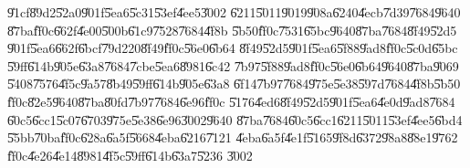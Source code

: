 \U{91cf}\U{89d2}\U{52a0}\U{901f}\U{5ea6}\U{5c31}\U{53ef}\U{4ee5}\U{3002}%
\U{6211}\U{5011}\U{9019}\U{908a}\U{6240}\U{4ecb}\U{7d39}\U{7684}\U{9640}%
\U{87ba}\U{ff0c}\U{662f}\U{4e00}\U{500b}\U{61c9}\U{7528}\U{7684}\U{4f8b}%
\U{5b50}\U{ff0c}\U{7531}\U{65bc}\U{9640}\U{87ba}\U{7684}\U{8f49}\U{52d5}%
\U{901f}\U{5ea6}\U{662f}\U{6bcf}\U{79d2}20\U{8f49}\U{ff0c}\U{56e0}\U{6b64}%
\U{8f49}\U{52d5}\U{901f}\U{5ea6}\U{5f88}\U{9ad8}\U{ff0c}\U{5c0d}\U{65bc}%
\U{59ff}\U{614b}\U{905e}\U{63a8}\U{7684}\U{7cbe}\U{5ea6}\U{8981}\U{6c42}%
\U{7b97}\U{5f88}\U{9ad8}\U{ff0c}\U{56e0}\U{6b64}\U{9640}\U{87ba}\U{9069}%
\U{5408}\U{7576}\U{4f5c}\U{9a57}\U{8b49}\U{59ff}\U{614b}\U{905e}\U{63a8}%
\U{6f14}\U{7b97}\U{7684}\U{975e}\U{5e38}\U{597d}\U{7684}\U{4f8b}\U{5b50}%
\U{ff0c}\U{82e5}\U{9640}\U{87ba}\U{80fd}\U{7b97}\U{7684}\U{6e96}\U{ff0c}%
\U{5176}\U{4ed6}\U{8f49}\U{52d5}\U{901f}\U{5ea6}\U{4e0d}\U{9ad8}\U{7684}%
\U{60c5}\U{6cc1}\U{5c07}\U{6703}\U{975e}\U{5e38}\U{6e96}\U{3002}\U{9640}%
\U{87ba}\U{7684}\U{60c5}\U{6cc1}\U{6211}\U{5011}\U{53ef}\U{4ee5}\U{6bd4}%
\U{55bb}\U{70ba}\U{ff0c}\U{628a}\U{6a5f}\U{5668}\U{4eba}\U{6216}\U{7121}%
\U{4eba}\U{6a5f}\U{4e1f}\U{5165}\U{9f8d}\U{6372}\U{98a8}\U{88e1}\U{9762}%
\U{ff0c}\U{4e26}\U{4e14}\U{8981}\U{4f5c}\U{59ff}\U{614b}\U{63a7}\U{5236}%
\U{3002}

%
